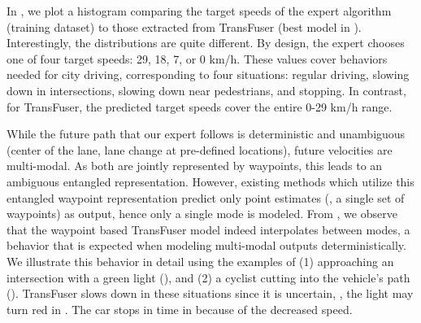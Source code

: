 In , we plot a histogram comparing the target speeds of the expert algorithm (\ie training dataset) to those extracted from TransFuser (best model in ). Interestingly, the distributions are quite different. By design, the expert chooses one of four target speeds: 29, 18, 7, or 0 km/h. These values cover behaviors needed for city driving, corresponding to four situations: regular driving, slowing down in intersections, slowing down near pedestrians, and stopping. In contrast, for TransFuser, the predicted target speeds cover the entire 0-29 km/h range.

While the future path that our expert follows is deterministic and unambiguous (center of the lane, lane change at pre-defined locations), future velocities are multi-modal. As both are jointly represented by waypoints, this leads to an ambiguous entangled representation. However, existing methods which utilize this entangled waypoint representation predict only point estimates (\ie, a single set of waypoints) as output, hence only a single mode is modeled. From , we observe that the waypoint based TransFuser model indeed interpolates between modes, a behavior that is expected when modeling multi-modal outputs deterministically. We illustrate this behavior in detail using the examples of (1) approaching an intersection with a green light (), and (2) a cyclist cutting into the vehicle's path (). TransFuser slows down in these situations since it is uncertain, \eg, the light may turn red in . The car stops in time in  because of the decreased speed.

